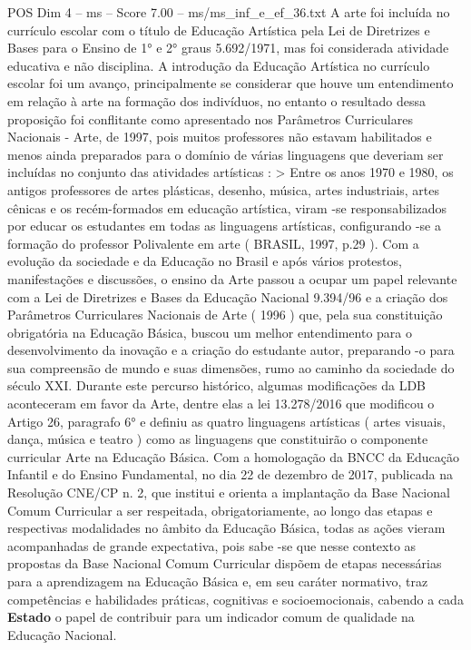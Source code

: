\begin{textsample}{POS Dim 4 – ms – Score 7.00 – ms/ms\_inf\_e\_ef\_36.txt}
A arte foi incluída no currículo escolar com o título de Educação Artística pela Lei de Diretrizes e Bases para o Ensino de 1{\EmojiFont °} e 2{\EmojiFont °} graus 5.692/1971, mas foi considerada atividade educativa e não disciplina.
A introdução da Educação Artística no currículo escolar foi um avanço, principalmente se considerar que houve um entendimento em relação à arte na formação dos indivíduos, no entanto o resultado dessa proposição foi conflitante como apresentado nos Parâmetros Curriculares Nacionais - Arte, de 1997, pois muitos professores não estavam habilitados e menos ainda preparados para o domínio de várias linguagens que deveriam ser incluídas no conjunto das atividades artísticas : > Entre os anos 1970 e 1980, os antigos professores de artes plásticas, desenho, música, artes industriais, artes cênicas e os recém-formados em educação artística, viram -se responsabilizados por educar os estudantes em todas as linguagens artísticas, configurando -se a formação do professor Polivalente em arte ( BRASIL, 1997, p.29 ).
Com a evolução da sociedade e da Educação no Brasil e após vários protestos, manifestações e discussões, o ensino da Arte passou a ocupar um papel relevante com a Lei de Diretrizes e Bases da Educação Nacional 9.394/96 e a criação dos Parâmetros Curriculares Nacionais de Arte ( 1996 ) que, pela sua constituição obrigatória na Educação Básica, buscou um melhor entendimento para o desenvolvimento da inovação e a criação do estudante autor, preparando -o para sua compreensão de mundo e suas dimensões, rumo ao caminho da sociedade do século XXI.
Durante este percurso histórico, algumas modificações da LDB aconteceram em favor da Arte, dentre elas a lei 13.278/2016 que modificou o Artigo 26, paragrafo 6{\EmojiFont °} e definiu as quatro linguagens artísticas ( artes visuais, dança, música e teatro ) como as linguagens que constituirão o componente curricular Arte na Educação Básica.
Com a homologação da BNCC da Educação Infantil e do Ensino Fundamental, no dia 22 de dezembro de 2017, publicada na Resolução CNE/CP n. 2, que institui e orienta a implantação da Base Nacional Comum Curricular a ser respeitada, obrigatoriamente, ao longo das etapas e respectivas modalidades no âmbito da Educação Básica, todas as ações vieram acompanhadas de grande expectativa, pois sabe -se que nesse contexto as propostas da Base Nacional Comum Curricular dispõem de etapas necessárias para a aprendizagem na Educação Básica e, em seu caráter normativo, traz competências e habilidades práticas, cognitivas e socioemocionais, cabendo a cada \textbf{Estado} o papel de contribuir para um indicador comum de qualidade na Educação Nacional.

\end{textsample}

